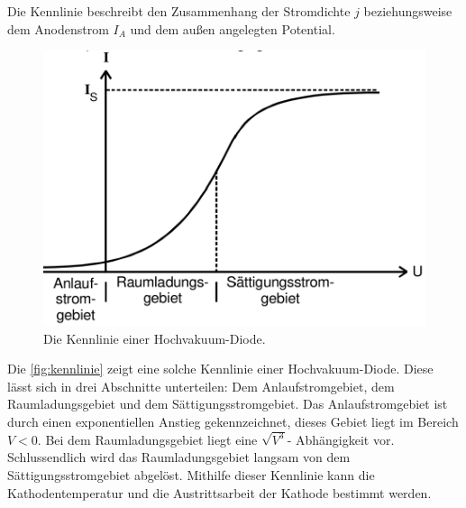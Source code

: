 Die Kennlinie beschreibt den Zusammenhang der Stromdichte $j$ beziehungsweise dem Anodenstrom $I_A$ 
und dem außen angelegten Potential.

\begin{figure}[H]
    \centering
    \includegraphics[width=0.5\linewidth]{content/grafik/kennlinie.png}
    \caption{Die Kennlinie einer Hochvakuum-Diode.\cite{elektron}}
    \label{fig:kennlinie}
\end{figure}

Die \autoref{fig:kennlinie} zeigt eine solche Kennlinie einer Hochvakuum-Diode.  Diese lässt sich in drei Abschnitte 
unterteilen: Dem Anlaufstromgebiet, dem Raumladungsgebiet und dem Sättigungsstromgebiet. Das Anlaufstromgebiet ist durch einen
exponentiellen Anstieg gekennzeichnet, dieses Gebiet liegt im Bereich $V < 0$. Bei dem Raumladungsgebiet liegt eine
$\sqrt{V^3}$- Abhängigkeit vor. Schlussendlich wird das Raumladungsgebiet langsam von dem Sättigungsstromgebiet abgelöst. 
Mithilfe dieser Kennlinie kann die Kathodentemperatur und die Austrittsarbeit der Kathode bestimmt werden.
